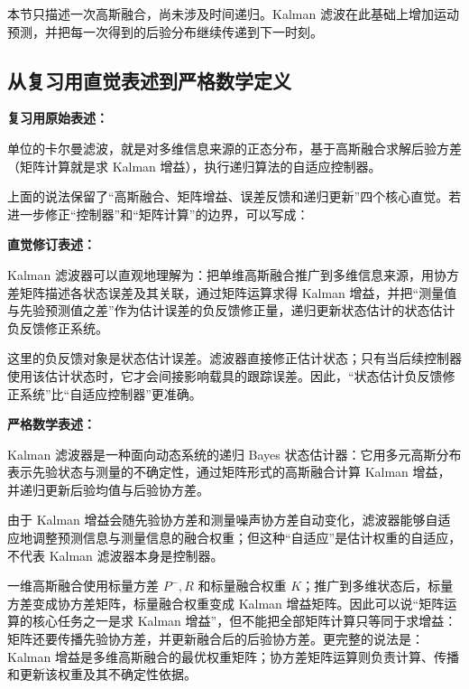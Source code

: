 \documentclass[UTF8,a4paper,11pt]{ctexart}
\newcommand{\prior}{^{-}}
\begin{document}
本节只描述一次高斯融合，尚未涉及时间递归。Kalman 滤波在此基础上增加运动预测，并把每一次得到的后验分布继续传递到下一时刻。

\subsection{从复习用直觉表述到严格数学定义}

\begin{keybox}
\textbf{复习用原始表述：}

单位的卡尔曼滤波，就是对多维信息来源的正态分布，基于高斯融合求解后验方差（矩阵计算就是求 Kalman 增益），执行递归算法的自适应控制器。
\end{keybox}

上面的说法保留了“高斯融合、矩阵增益、误差反馈和递归更新”四个核心直觉。若进一步修正“控制器”和“矩阵计算”的边界，可以写成：

\begin{keybox}
\textbf{直觉修订表述：}

Kalman 滤波器可以直观地理解为：把单维高斯融合推广到多维信息来源，用协方差矩阵描述各状态误差及其关联，通过矩阵运算求得 Kalman 增益，并把“测量值与先验预测值之差”作为估计误差的负反馈修正量，递归更新状态估计的状态估计负反馈修正系统。
\end{keybox}

这里的负反馈对象是状态估计误差。滤波器直接修正估计状态；只有当后续控制器使用该估计状态时，它才会间接影响载具的跟踪误差。因此，“状态估计负反馈修正系统”比“自适应控制器”更准确。

\begin{keybox}
\textbf{严格数学表述：}

Kalman 滤波器是一种面向动态系统的递归 Bayes 状态估计器：它用多元高斯分布表示先验状态与测量的不确定性，通过矩阵形式的高斯融合计算 Kalman 增益，并递归更新后验均值与后验协方差。
\end{keybox}

由于 Kalman 增益会随先验协方差和测量噪声协方差自动变化，滤波器能够自适应地调整预测信息与测量信息的融合权重；但这种“自适应”是估计权重的自适应，不代表 Kalman 滤波器本身是控制器。

一维高斯融合使用标量方差 $P\prior,R$ 和标量融合权重 $K$；推广到多维状态后，标量方差变成协方差矩阵，标量融合权重变成 Kalman 增益矩阵。因此可以说“矩阵运算的核心任务之一是求 Kalman 增益”，但不能把全部矩阵计算只等同于求增益：矩阵还要传播先验协方差，并更新融合后的后验协方差。更完整的说法是：Kalman 增益是多维高斯融合的最优权重矩阵；协方差矩阵运算则负责计算、传播和更新该权重及其不确定性依据。
\end{document}
